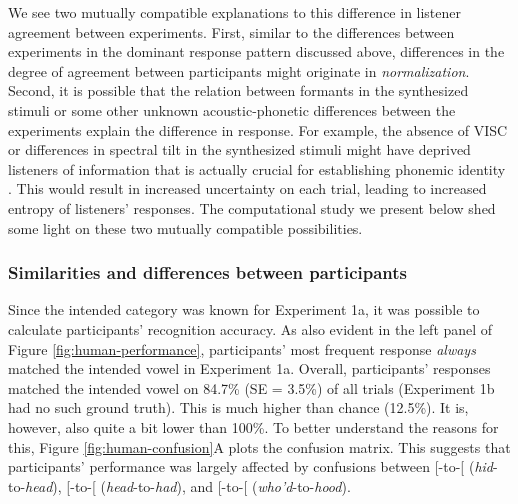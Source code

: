 \documentclass[preprint]{JASA}
\begin{document}
We see two mutually compatible explanations to this difference in listener agreement between experiments. First, similar to the differences between experiments in the dominant response pattern discussed above, differences in the degree of agreement between participants might originate in \emph{normalization}. Second, it is possible that the relation between formants in the synthesized stimuli or some other unknown acoustic-phonetic differences between the experiments explain the difference in response. For example, the absence of VISC or differences in spectral tilt in the synthesized stimuli might have deprived listeners of information that is actually crucial for establishing phonemic identity \citep{hillenbrand-nearey1999}. This would result in increased uncertainty on each trial, leading to increased entropy of listeners' responses. The computational study we present below shed some light on these two mutually compatible possibilities.

\subsubsection{Similarities and differences between participants}\label{similarities-and-differences-between-participants}

Since the intended category was known for Experiment 1a, it was possible to calculate participants' recognition accuracy. As also evident in the left panel of Figure \ref{fig:human-performance}, participants' most frequent response \emph{always} matched the intended vowel in Experiment 1a. Overall, participants' responses matched the intended vowel on 84.7\% (SE = 3.5\%) of all trials (Experiment 1b had no such ground truth). This is much higher than chance (12.5\%). It is, however, also quite a bit lower than 100\%. To better understand the reasons for this, Figure \ref{fig:human-confusion}A plots the confusion matrix. This suggests that participants' performance was largely affected by confusions between {[}\textipa{I}{]}-to-{[}\textipa{E}{]} (\emph{hid}-to-\emph{head}), {[}\textipa{E}{]}-to-{[}\textipa{\ae}{]} (\emph{head}-to-\emph{had}), and {[}\textipa{u}{]}-to-{[}\textipa{U}{]} (\emph{who'd}-to-\emph{hood}).
\end{document}
